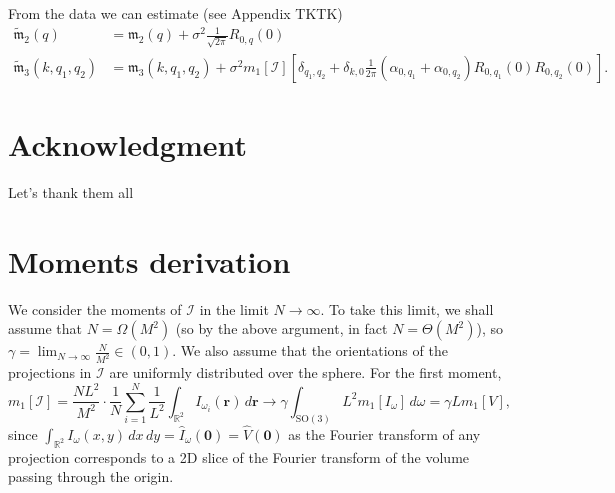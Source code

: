 \documentclass[english,11pt]{article}
\newcommand{\1}{\mathbf{1}}
\newcommand{\rr}{\textbf{r}}
\newcommand{\II}{\mathcal{I}}
\newcommand{\RR}{\mathbb{R}}
\newcommand{\TODO}[1]{{\color{red}{[#1]}}}
\numberwithin{equation}{section}
\theoremstyle{plain}
\theoremstyle{definition}
\theoremstyle{remark}
\theoremstyle{plain}
\theoremstyle{remark}
\theoremstyle{plain}
\theoremstyle{plain}
\begin{document}
From the data we can estimate (see Appendix TKTK) 
\begin{align*}
\widetilde{\mathfrak{m}}_2(q) &= \mathfrak{m}_2(q) + \sigma^2\frac{1}{\sqrt{2\pi}}R_{0,q}(0) \\
\widetilde{\mathfrak{m}}_3(k,q_1,q_2) &= \mathfrak{m}_3(k,q_1,q_2) +
\sigma^2m_1[\II]\left[\delta_{q_1,q_2} + \delta_{k,0}\frac{1}{2\pi}(\alpha_{0,q_1}+\alpha_{0,q_2})R_{0,q_1}(0)R_{0,q_2}(0)\right].
\end{align*} 



\section*{Acknowledgment}
Let's thank them all






\appendix


\section{Moments derivation}

\TODO{To rewrite for the discrete case}
We consider the moments of $\II$ in the limit $N\to\infty$. To take this limit, we shall assume that $N=\Omega(M^2)$ (so by the above argument, in fact $N=\Theta(M^2)$), so $\gamma = \lim_{N\to\infty}\frac{N}{M^2}\in(0,1)$. We also assume that the orientations of the projections in $\II$ are uniformly distributed over the sphere. For the first moment,
\[ m_1[\II] =
\frac{NL^2}{M^2}\cdot\frac{1}{N}\sum_{i=1}^N\frac{1}{L^2}\int_{\RR^2}I_{\omega_i}(\rr)\,
d\rr \to \gamma\int_{\text{SO}(3)} L^2m_1[I_{\omega}]\, d\omega =
\gamma L m_1[V],\]
since $\int_{\RR^2} I_{\omega}(x,y)\, dx\, dy = \widehat I_{\omega}(\mathbf{0})=\widehat V(\mathbf{0})$ as the Fourier transform of any projection corresponds to a 2D slice of the Fourier transform of the volume passing through the origin.
\end{document}
